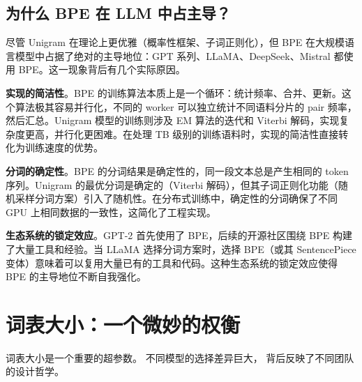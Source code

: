 \subsection{为什么 BPE 在 LLM 中占主导？}

尽管 Unigram 在理论上更优雅（概率性框架、子词正则化），但 BPE 在大规模语言模型中占据了绝对的主导地位：GPT 系列、LLaMA、DeepSeek、Mistral 都使用 BPE。这一现象背后有几个实际原因。

\textbf{实现的简洁性}。BPE 的训练算法本质上是一个循环：统计频率、合并、更新。这个算法极其容易并行化，不同的 worker 可以独立统计不同语料分片的 pair 频率，然后汇总。Unigram 模型的训练则涉及 EM 算法的迭代和 Viterbi 解码，实现复杂度更高，并行化更困难。在处理 TB 级别的训练语料时，实现的简洁性直接转化为训练速度的优势。

\textbf{分词的确定性}。BPE 的分词结果是确定性的，同一段文本总是产生相同的 token 序列。Unigram 的最优分词是确定的（Viterbi 解码），但其子词正则化功能（随机采样分词方案）引入了随机性。在分布式训练中，确定性的分词确保了不同 GPU 上相同数据的一致性，这简化了工程实现。

\textbf{生态系统的锁定效应}。GPT-2 首先使用了 BPE，后续的开源社区围绕 BPE 构建了大量工具和经验。当 LLaMA 选择分词方案时，选择 BPE（或其 SentencePiece 变体）意味着可以复用大量已有的工具和代码。这种生态系统的锁定效应使得 BPE 的主导地位不断自我强化。

\section{词表大小：一个微妙的权衡}

词表大小是一个重要的超参数。
不同模型的选择差异巨大，
背后反映了不同团队的设计哲学。

